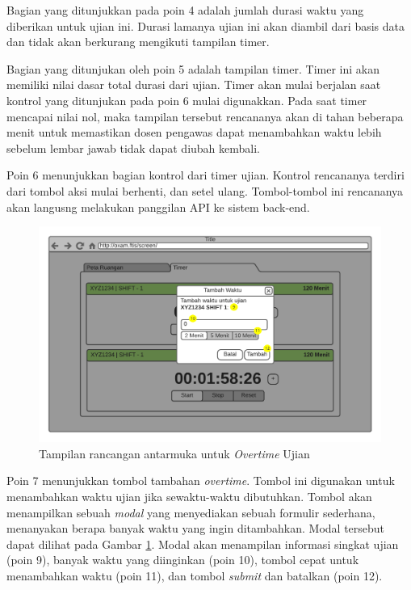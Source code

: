     Bagian yang ditunjukkan pada poin 4 adalah jumlah durasi waktu yang diberikan untuk ujian ini. Durasi
    lamanya ujian ini akan diambil dari basis data dan tidak akan berkurang mengikuti tampilan timer.
    
    Bagian yang ditunjukan oleh poin 5 adalah tampilan timer. Timer ini akan memiliki nilai dasar total
    durasi dari ujian. Timer akan mulai berjalan saat kontrol yang ditunjukan pada poin 6 mulai digunakkan.
    Pada saat timer mencapai nilai nol, maka tampilan tersebut rencananya akan di tahan beberapa menit
    untuk memastikan dosen pengawas dapat menambahkan waktu lebih sebelum lembar jawab tidak dapat diubah
    kembali.
    
    Poin 6 menunjukkan bagian kontrol dari timer ujian. Kontrol rencananya terdiri dari tombol aksi mulai
    berhenti, dan setel ulang. Tombol-tombol ini rencananya akan langusng melakukan panggilan API
    ke sistem back-end.
    
    \begin{figure}
        \centering
        \includegraphics[width=0.7\paperwidth]{Gambar/mockups/Mockup--DosenPengawas - Timer + Overtime.pdf}
        \caption{Tampilan rancangan antarmuka untuk \textit{Overtime} Ujian}
        \label{fig:mockup_dosen_overtime}
    \end{figure}
    
    Poin 7 menunjukkan tombol tambahan \textit{overtime}. Tombol ini digunakan untuk menambahkan waktu
    ujian jika sewaktu-waktu dibutuhkan. Tombol akan menampilkan sebuah \textit{modal} yang menyediakan
    sebuah formulir sederhana, menanyakan berapa banyak waktu yang ingin ditambahkan. Modal tersebut
    dapat dilihat pada Gambar \ref{fig:mockup_dosen_overtime}. Modal akan menampilan informasi
    singkat ujian (poin 9), banyak waktu yang diinginkan (poin 10), tombol cepat untuk menambahkan waktu
    (poin 11), dan tombol \textit{submit} dan batalkan (poin 12).
    
